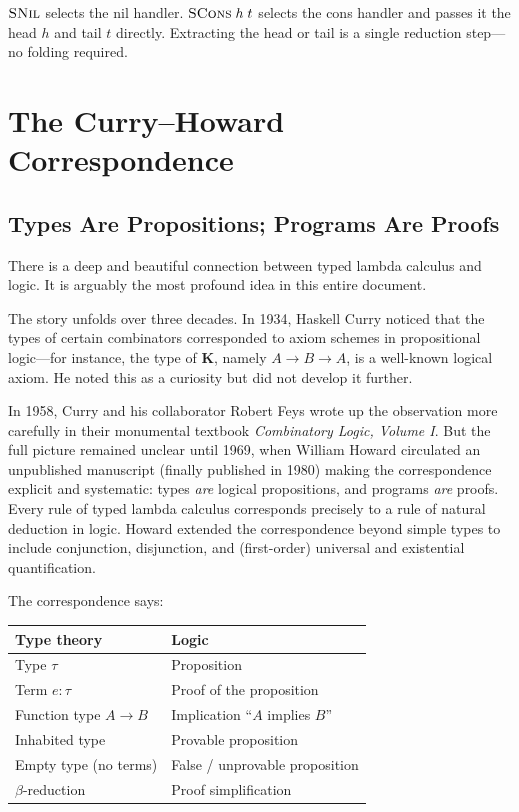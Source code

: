 \documentclass[11pt,a4paper]{article}
\theoremstyle{definition}
\begin{document}
$\textsc{SNil}$ selects the nil handler. $\textsc{SCons}\;h\;t$ selects the
cons handler and passes it the head $h$ and tail $t$ directly. Extracting the
head or tail is a single reduction step---no folding required.

\section{The Curry--Howard Correspondence}\label{sec:curryhoward}

\subsection{Types Are Propositions; Programs Are Proofs}

There is a deep and beautiful connection between typed lambda calculus and
logic. It is arguably the most profound idea in this entire document.

The story unfolds over three decades. In 1934, Haskell Curry noticed that the
types of certain combinators corresponded to axiom schemes in propositional
logic---for instance, the type of $\mathbf{K}$, namely $A \to B \to A$,
is a well-known logical axiom. He noted this as a curiosity but did not develop
it further.

In 1958, Curry and his collaborator Robert Feys wrote up the observation more
carefully in their monumental textbook \emph{Combinatory Logic, Volume I}. But
the full picture remained unclear until 1969, when William Howard circulated an
unpublished manuscript (finally published in 1980) making the correspondence
explicit and systematic: types \emph{are} logical propositions, and programs
\emph{are} proofs. Every rule of typed lambda calculus corresponds precisely to
a rule of natural deduction in logic. Howard extended the correspondence beyond
simple types to include conjunction, disjunction, and (first-order) universal
and existential quantification.

The correspondence says:

\begin{center}
\renewcommand{\arraystretch}{1.5}
\begin{tabular}{ll}
\textbf{Type theory} & \textbf{Logic} \\
\hline
Type $\tau$               & Proposition \\
Term $e : \tau$           & Proof of the proposition \\
Function type $A \to B$   & Implication ``$A$ implies $B$'' \\
Inhabited type            & Provable proposition \\
Empty type (no terms)     & False / unprovable proposition \\
$\beta$-reduction         & Proof simplification \\
\end{tabular}
\end{center}
\end{document}
